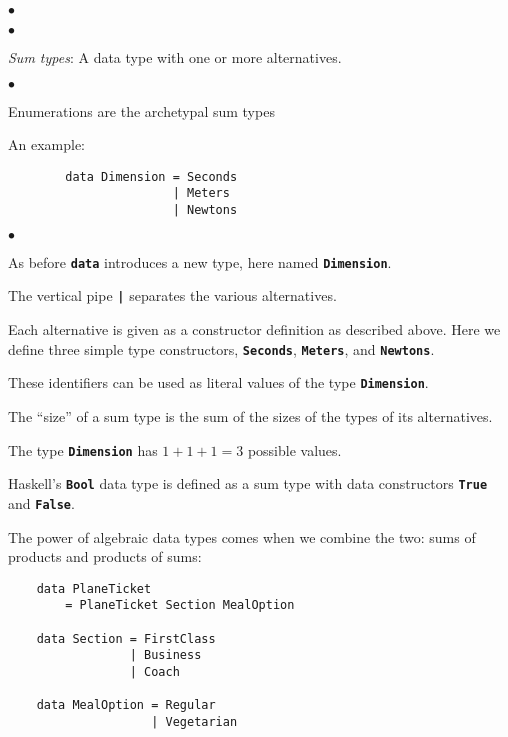 \documentclass[12pt]{article}
\newcommand\code[1]{\texttt{\textbf{#1}}}
\newenvironment{notelist}{\begin{list}
   {$\bullet$}
   {\setlength{\itemsep}{0in}}}
   {\end{list}}
\begin{document}
\begin{notelist}
\begin{notelist}
    \item \textit{Sum types}: A data type with one or more alternatives.
    \begin{notelist}
        \item Enumerations are the archetypal sum types
        \item An example:
        \begin{lstlisting}
        data Dimension = Seconds
                       | Meters
                       | Newtons
        \end{lstlisting}
        \begin{notelist}
            \item As before \code{data} introduces a new type, here named \code{Dimension}.
            \item The vertical pipe \code{|} separates the various alternatives.
            \item Each alternative is given as a constructor definition as described above.
                  Here we define three simple type constructors, \code{Seconds}, \code{Meters}, and
                  \code{Newtons}.
            \item These identifiers can be used as literal values of the type \code{Dimension}. 
        \end{notelist}
        \item The ``size'' of a sum type is the sum of the sizes of the types of its alternatives.
        \item The type \code{Dimension} has $1 + 1 + 1 = 3$ possible values.
        \item Haskell's \code{Bool} data type is defined as a sum type with data constructors \code{True} and \code{False}.
    \end{notelist}

    \item The power of algebraic data types comes when we combine the two: sums of products and products of sums:
    \begin{lstlisting}
    data PlaneTicket
        = PlaneTicket Section MealOption

    data Section = FirstClass
                 | Business
                 | Coach

    data MealOption = Regular
                    | Vegetarian


\end{lstlisting}
\end{notelist}
\end{notelist}
\end{document}
